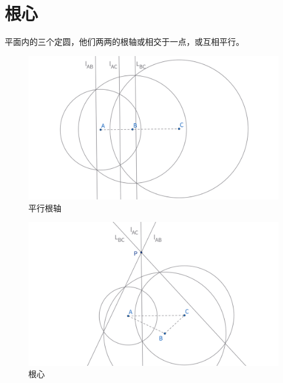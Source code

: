 \section{根心}
\begin{theorem}[根心定理]
    平面内的三个定圆，他们两两的根轴或相交于一点，或互相平行。
\end{theorem}
\begin{figure}[H]
    \centering
    \includegraphics[width=0.8\linewidth]{figures/平行根轴.png}
    \caption{平行根轴}
\end{figure}
\begin{figure}[H]
    \centering
    \includegraphics[width=0.8\linewidth]{figures/根心.png}
    \caption{根心}
\end{figure}